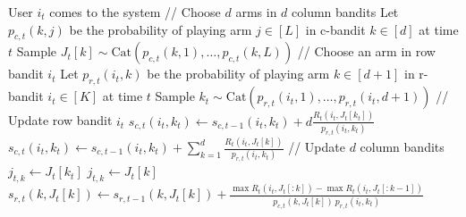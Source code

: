 \begin{algorithm}
  \begin{algorithmic}[1]
      \State User $i_t$ comes to the system
      \State
      \State // Choose $d$ arms in $d$ column bandits
      \State Let $p_{c, t}(k, j)$ be the probability of playing arm $j \in [L]$ in c-bandit $k \in [d]$ at time $t$
        \State Sample $J_t[k] \sim \mathrm{Cat}(p_{c, t}(k, 1), \dots, p_{c, t}(k, L))$
      \EndFor
      \State
      \State // Choose an arm in row bandit $i_t$
      \State Let $p_{r, t}(i_t, k)$ be the probability of playing arm $k \in [d + 1]$ in r-bandit $i_t \in [K]$ at time $t$
      \State Sample $k_t \sim \mathrm{Cat}(p_{r, t}(i_t, 1), \dots, p_{r, t}(i_t, d + 1))$
      \State
      \State // Update row bandit $i_t$
        \State $\displaystyle s_{c, t}(i_t, k_t) \gets s_{c, t - 1}(i_t, k_t) + d \frac{R_t(i_t, J_t[k_t])}{p_{r, t}(i_t, k_t)}$
      \Else
        \State $\displaystyle s_{c, t}(i_t, k_t) \gets s_{c, t - 1}(i_t, k_t) + \sum_{k = 1}^d \frac{R_t(i_t, J_t[k])}{p_{r, t}(i_t, k_t)}$
      \EndIf
      \State
      \State // Update $d$ column bandits
          \State $j_{t, k} \gets J_t[k_t]$
        \EndFor
      \Else
          \State $j_{t, k} \gets J_t[k]$
        \EndFor
          \State $\displaystyle
          s_{r, t}(k, J_t[k]) \gets s_{r, t - 1}(k, J_t[k]) +
          \frac{\max R_t(i_t, J_t[: k]) - \max R_t(i_t, J_t[: k - 1])}{p_{c, t}(k, J_t[k]) \ p_{r, t}(i_t, k_t)}$
        \EndFor
      \EndIf
    \EndFor
  \end{algorithmic}
\end{algorithm}
